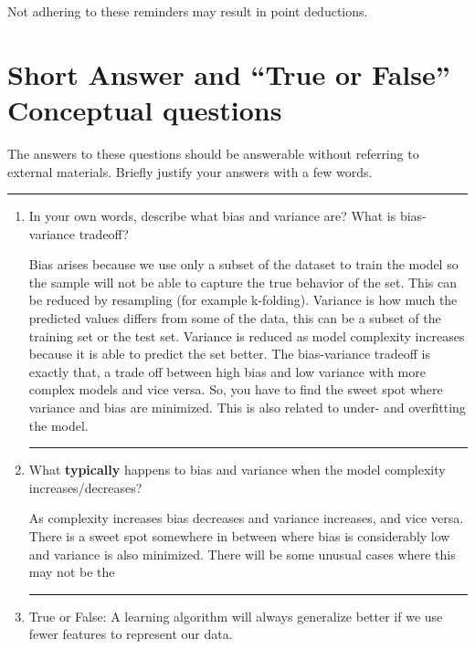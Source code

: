 \documentclass{article}
\begin{document}
Not adhering to these reminders may result in point deductions. \\

\clearpage{}



\section*{Short Answer and ``True or False'' Conceptual questions}
\begin{aprob}
    The answers to these questions should be answerable without referring to external materials.  Briefly justify your answers with a few words.
    
    \rule{\textwidth}{0.25pt}
    \begin{enumerate}
        \item{} In your own words, describe what bias and variance are? What is bias-variance tradeoff?
        
        Bias arises because we use only a subset of the dataset to train the model so the sample will not be able to capture the true behavior of the set. This can be reduced by resampling (for example k-folding).
        Variance is how much the predicted values differs from some of the data, this can be a subset of the training set or the test set. Variance is reduced as model complexity increases because it is able to predict the set better.
        The bias-variance tradeoff is exactly that, a trade off between high bias and low variance with more complex models and vice versa. So, you have to find the sweet spot where variance and bias are minimized. This is also related to under- and overfitting the model.

        \rule{\textwidth}{0.25pt}
        \newpage
        \item {} What \textbf{typically} happens to bias and variance when the model complexity increases/decreases?

        As complexity increases bias decreases and variance increases, and vice versa. There is a sweet spot somewhere in between where bias is considerably low and variance is also minimized. There will be some unusual cases where this may not be the

        \rule{\textwidth}{0.25pt}
        \newpage
        \item {} True or False: A learning algorithm will always generalize better if we use fewer features to represent our data.


\end{enumerate}
\end{aprob}
\end{document}
